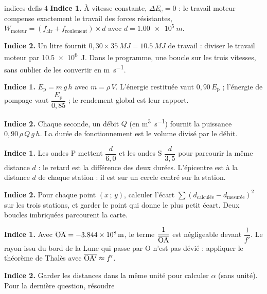 \begin{blocEdition}{indices-defis-4}
\textbf{Indice 1.} À vitesse constante, $\Delta E_\mathrm{c}=0$ : le travail moteur compense exactement le travail des forces résistantes,
$W_\mathrm{moteur}=(f_\mathrm{air}+f_\mathrm{roulement})\times d$ avec $d=\qty{1,00e5}{m}$.\par\smallskip
\textbf{Indice 2.} Un litre fournit $0{,}30\times\qty{35}{MJ}=\qty{10,5}{MJ}$ de travail : diviser le travail moteur par \qty{10,5e6}{J}. Dans le programme, une
boucle  sur les trois vitesses, sans oublier de les convertir en \unit{m.s^{-1}}.\par\smallskip
{}
\textbf{Indice 1.} $E_\mathrm{p}=m\,g\,h$ avec $m=\rho\,V$. L'énergie restituée vaut $0{,}90\,E_\mathrm{p}$ ; l'énergie de pompage vaut $\dfrac{E_\mathrm{p}}{0{,}85}$ ; le rendement
global est leur rapport.\par\smallskip
\textbf{Indice 2.} Chaque seconde, un débit $Q$ (en \unit{m^3.s^{-1}}) fournit la puissance $0{,}90\,\rho\,Q\,g\,h$. La durée de fonctionnement est le volume
divisé par le débit.\par\smallskip
{}
\textbf{Indice 1.} Les ondes P mettent $\dfrac{d}{6{,}0}$ et les ondes S $\dfrac{d}{3{,}5}$ pour parcourir la même distance $d$ : le retard est la différence des deux
durées. L'épicentre est à la distance $d$ de chaque station : il est sur un cercle centré sur la station.\par\smallskip
\textbf{Indice 2.} Pour chaque point $(x\,;\,y)$, calculer l'écart $\sum(d_\text{calculée}-d_\text{mesurée})^2$ sur les trois stations, et garder le point qui donne le plus petit
écart. Deux boucles  imbriquées parcourent la carte.\par\smallskip
{}
\textbf{Indice 1.} Avec $\overline{\mathrm{OA}}=\qty{-3,844e8}{m}$, le terme $\dfrac{1}{\overline{\mathrm{OA}}}$ est négligeable devant $\dfrac{1}{f'}$. Le rayon issu du bord de la Lune qui passe par O n'est
pas dévié : appliquer le théorème de Thalès avec $\overline{\mathrm{OA'}}\approx f'$.\par\smallskip
\textbf{Indice 2.} Garder les distances dans la même unité pour calculer $\alpha$ (sans unité). Pour la dernière question, résoudre

\end{blocEdition}
